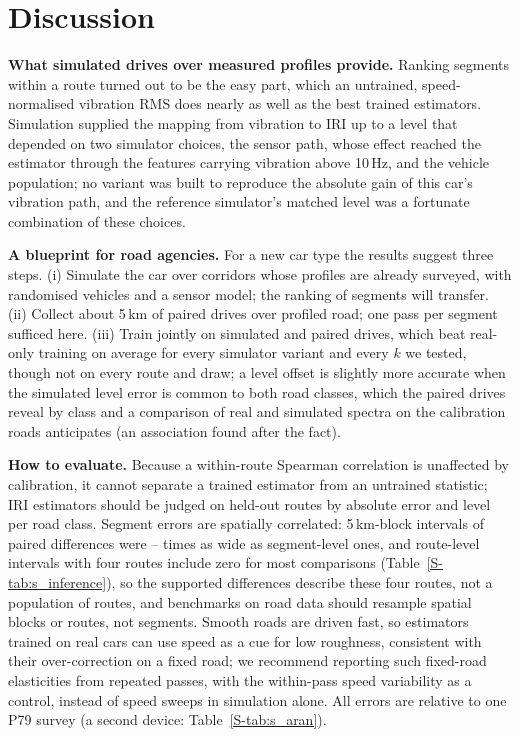 \section{Discussion}
\label{sec:discussion}

\textbf{What simulated drives over measured profiles provide.}
Ranking segments within a route turned out to be the easy part, which an untrained, speed-normalised vibration RMS does nearly as well as the best trained estimators.
Simulation supplied the mapping from vibration to IRI up to a level that depended on two simulator choices, the sensor path, whose effect reached the estimator through the features carrying vibration above 10\,Hz, and the vehicle population; no variant was built to reproduce the absolute gain of this car's vibration path, and the reference simulator's matched level was a fortunate combination of these choices.

\textbf{A blueprint for road agencies.}
For a new car type the results suggest three steps.
(i) Simulate the car over corridors whose profiles are already surveyed, with randomised vehicles and a sensor model; the ranking of segments will transfer.
(ii) Collect about 5\,km of paired drives over profiled road; one pass per segment sufficed here.
(iii) Train jointly on simulated and paired drives, which beat real-only training on average for every simulator variant and every $k$ we tested, though not on every route and draw; a level offset is slightly more accurate when the simulated level error is common to both road classes, which the paired drives reveal by class and a comparison of real and simulated spectra on the calibration roads anticipates (an association found after the fact).

\textbf{How to evaluate.}
Because a within-route Spearman correlation is unaffected by calibration, it cannot separate a trained estimator from an untrained statistic; IRI estimators should be judged on held-out routes by absolute error and level per road class.
Segment errors are spatially correlated: 5\,km-block intervals of paired differences were \infWidthRatioMin--\infWidthRatioMax{} times as wide as segment-level ones, and route-level intervals with four routes include zero for most comparisons (Table~\ref{S-tab:s_inference}), so the supported differences describe these four routes, not a population of routes, and benchmarks on road data should resample spatial blocks or routes, not segments.
Smooth roads are driven fast, so estimators trained on real cars can use speed as a cue for low roughness, consistent with their over-correction on a fixed road; we recommend reporting such fixed-road elasticities from repeated passes, with the within-pass speed variability as a control, instead of speed sweeps in simulation alone.
All errors are relative to one P79 survey (a second device: Table~\ref{S-tab:s_aran}).

